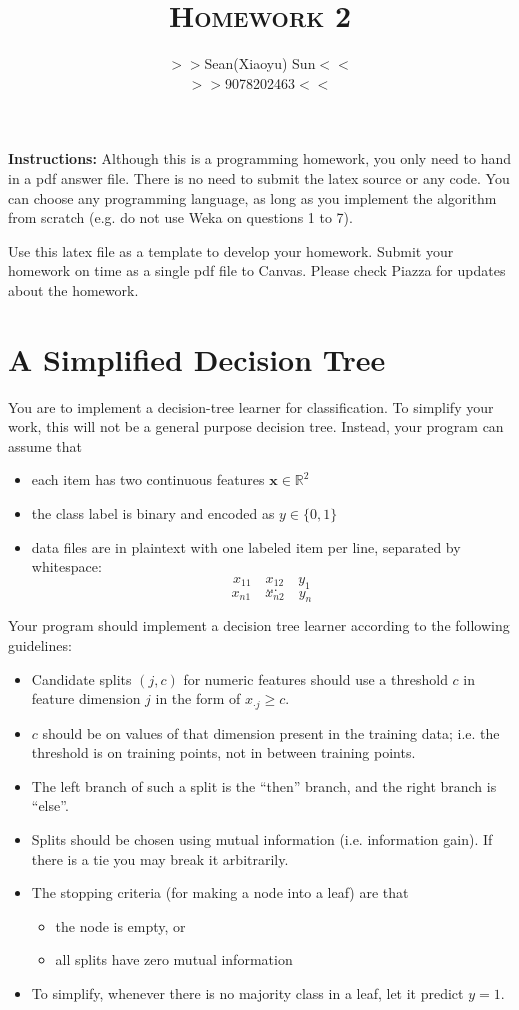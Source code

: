 \documentclass[a4paper]{article}
\title{\textsc{Homework 2}} %
\author{
$>>$Sean(Xiaoyu) Sun$<<$ \\
$>>$9078202463$<<$\\
}
\date{}
\theoremstyle{definition}
\newcommand{\RR}{\mathbb{R}}
\def\x{\mathbf x}
\begin{document}
\maketitle 


\textbf{Instructions:} 
Although this is a programming homework, you only need to hand in a pdf answer file.
There is no need to submit the latex source or any code.
You can choose any programming language, as long as you implement the algorithm from scratch (e.g. do not use Weka on questions 1 to 7).  

Use this latex file as a template to develop your homework.
Submit your homework on time as a single pdf file to Canvas.
Please check Piazza for updates about the homework.

\section{A Simplified Decision Tree}
You are to implement a decision-tree learner for classification.
To simplify your work, this will not be a general purpose decision tree.  Instead, your program can assume that
\begin{itemize}
\item each item has two continuous features $\x \in \RR^2$
\item the class label is binary and encoded as $y \in \{0,1\}$
\item data files are in plaintext with one labeled item per line, separated by whitespace:
$$x_{11} \quad x_{12} \quad y_1$$
$$...$$
$$x_{n1} \quad x_{n2} \quad y_n$$
\end{itemize}

Your program should implement a decision tree learner according to the following guidelines:
\begin{itemize}
\item Candidate splits $(j,c)$ for numeric features should use a threshold $c$ in feature dimension $j$ in the form of $x_{\cdot j}\ge c$.
\item $c$ should be on values of that dimension present in the training data; i.e. the threshold is on training points, not in between training points.
\item The left branch of such a split is the ``then'' branch, and the right branch is ``else''.
\item Splits should be chosen using mutual information (i.e. information gain). If there is a tie you may break it arbitrarily.
\item The stopping criteria (for making a node into a leaf) are that 
	\begin{itemize}
	\item the node is empty, or
	\item all splits have zero mutual information
	\end{itemize}
\item To simplify, whenever there is no majority class in a leaf, let it predict $y=1$.
\end{itemize}
\end{document}

